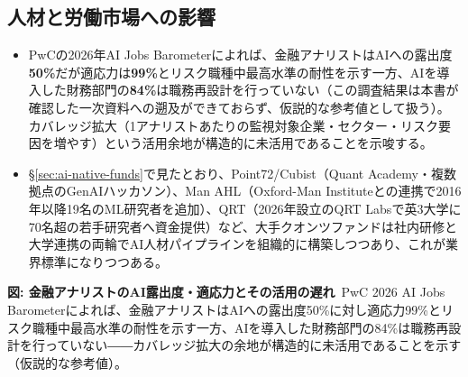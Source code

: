 \subsection{人材と労働市場への影響}

\begin{itemize}
  \item PwCの2026年AI Jobs Barometerによれば、金融アナリストはAIへの露出度\textbf{50\%}だが適応力は\textbf{99\%}とリスク職種中最高水準の耐性を示す一方、AIを導入した財務部門の\textbf{84\%}は職務再設計を行っていない（この調査結果は本書が確認した一次資料への遡及ができておらず、仮説的な参考値として扱う）。カバレッジ拡大（1アナリストあたりの監視対象企業・セクター・リスク要因を増やす）という活用余地が構造的に未活用であることを示唆する。
  \item \S\ref{sec:ai-native-funds}で見たとおり、Point72/Cubist（Quant Academy・複数拠点のGenAIハッカソン）、Man AHL（Oxford-Man Instituteとの連携で2016年以降19名のML研究者を追加）、QRT（2026年設立のQRT Labsで英3大学に70名超の若手研究者へ資金提供）など、大手クオンツファンドは社内研修と大学連携の両輪でAI人材パイプラインを組織的に構築しつつあり、これが業界標準になりつつある。
\end{itemize}

\begin{center}
\end{center}
{\small\color{brandgray}\textbf{図: 金融アナリストのAI露出度・適応力とその活用の遅れ}\ PwC 2026 AI Jobs Barometerによれば、金融アナリストはAIへの露出度50\%に対し適応力99\%とリスク職種中最高水準の耐性を示す一方、AIを導入した財務部門の84\%は職務再設計を行っていない――カバレッジ拡大の余地が構造的に未活用であることを示す（仮説的な参考値）。}

